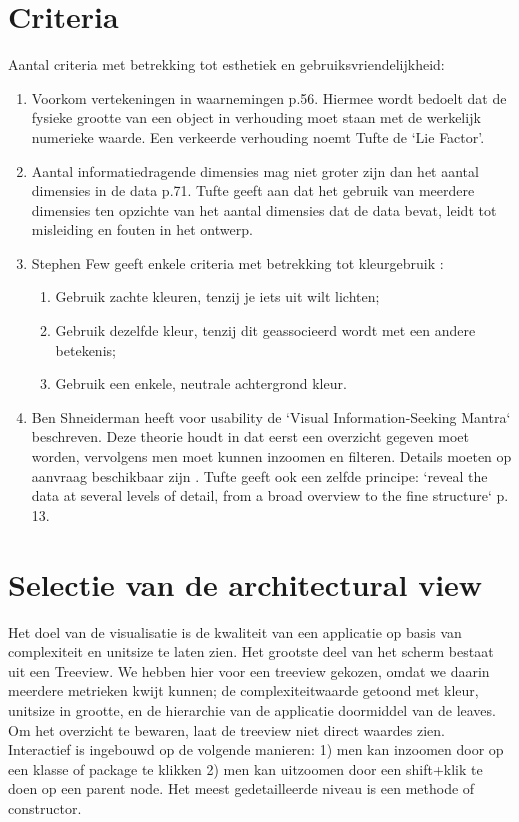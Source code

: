 \documentclass[a4paper]{article}
\begin{document}
\section{Criteria}
Aantal criteria met betrekking tot esthetiek en gebruiksvriendelijkheid:
\begin{enumerate}
\item Voorkom vertekeningen in waarnemingen \cite{tufte2014visual} p.56. Hiermee wordt bedoelt dat de fysieke grootte van een object in verhouding moet staan met de werkelijk numerieke waarde. Een verkeerde verhouding noemt Tufte de `Lie Factor'.
\item Aantal informatiedragende dimensies mag niet groter zijn dan het aantal dimensies in de data \cite{tufte2014visual} p.71. Tufte geeft aan dat het gebruik van meerdere dimensies ten opzichte van het aantal dimensies dat de data bevat, leidt tot misleiding en fouten in het ontwerp.

\item Stephen Few geeft enkele criteria met betrekking tot kleurgebruik \cite{B}:
\begin{enumerate}
\item Gebruik zachte kleuren, tenzij je iets uit wilt lichten;
\item Gebruik dezelfde kleur, tenzij dit geassocieerd wordt met een andere betekenis;
\item Gebruik een enkele, neutrale achtergrond kleur.
\end{enumerate}

\item Ben Shneiderman heeft voor usability de `Visual Information-Seeking Mantra` beschreven. Deze theorie houdt in dat eerst een overzicht gegeven moet worden, vervolgens men moet kunnen inzoomen en filteren. Details moeten op aanvraag beschikbaar zijn \cite{A}. Tufte geeft ook een zelfde principe: `reveal the data at several levels of detail, from a broad overview to the fine structure` \cite{tufte2014visual} p. 13.
\end{enumerate}


\section{Selectie van de architectural view}
Het doel van de visualisatie is de kwaliteit van een applicatie op basis van complexiteit en unitsize te laten zien. Het grootste deel van het scherm bestaat uit een Treeview. We hebben hier voor een treeview gekozen, omdat we daarin meerdere metrieken kwijt kunnen; de complexiteitwaarde getoond met kleur,  unitsize in grootte, en de hierarchie van de applicatie doormiddel van de leaves. Om het overzicht te bewaren, laat de treeview niet direct waardes zien. Interactief is ingebouwd op de volgende manieren: 1) men kan inzoomen door op een klasse of package te klikken 2) men kan uitzoomen door een shift+klik te doen op een parent node. Het meest gedetailleerde niveau is een methode of constructor.
\end{document}
